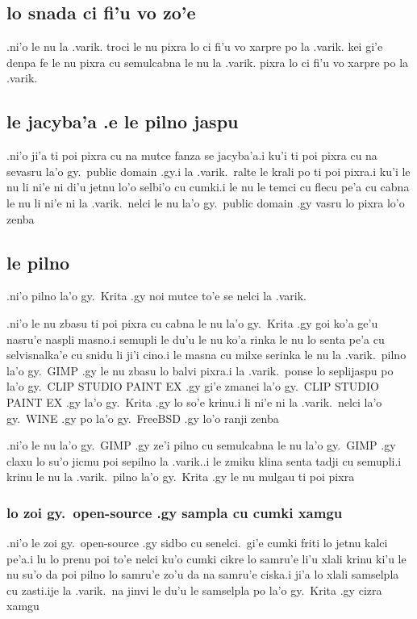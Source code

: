 \documentclass{report}
\begin{document}
\subsection{lo snada ci fi'u vo zo'e}
.ni'o le nu la .varik. troci le nu pixra lo ci fi'u vo xarpre po la .varik. kei gi'e denpa fe le nu pixra cu semulcabna le nu la .varik. pixra lo ci fi'u vo xarpre po la .varik.
\subsection{le jacyba'a .e le pilno jaspu}
.ni'o ji'a ti poi pixra cu na mutce fanza se jacyba'a\@  .i ku'i ti poi pixra cu na sevasru la'o gy.\ public domain .gy\@  .i la .varik.\ ralte le krali po ti poi pixra\@  .i ku'i le nu li ni'e ni di'u jetnu lo'o selbi'o cu cumki\@  .i le nu le temci cu flecu pe'a cu cabna le nu li ni'e ni la .varik.\ nelci le nu la'o gy.\ public domain .gy vasru lo pixra lo'o zenba
\subsection{le pilno}
.ni'o pilno la'o gy.\ Krita .gy noi mutce to'e se nelci la .varik.

.ni'o le nu zbasu ti poi pixra cu cabna le nu la'o gy.\ Krita .gy goi ko'a ge'u nasru'e naspli masno\@  .i semupli le du'u le nu ko'a rinka le nu lo senta pe'a cu selvisnalka'e cu snidu li ji'i cino\@  .i le masna cu milxe serinka le nu la .varik.\ pilno la'o gy.\ GIMP .gy le nu zbasu lo balvi pixra\@  .i la .varik.\ ponse lo seplijaspu po la'o gy.\ CLIP STUDIO PAINT EX .gy gi'e zmanei la'o gy.\ CLIP STUDIO PAINT EX .gy la'o gy.\ Krita .gy lo so'e krinu\@  .i li ni'e ni la .varik.\ nelci la'o gy.\ WINE .gy po la'o gy.\ FreeBSD .gy lo'o ranji zenba

.ni'o le nu la'o gy.\ GIMP .gy ze'i pilno cu semulcabna le nu la'o gy.\ GIMP .gy claxu lo su'o jicmu poi sepilno la .varik.\@  .i le zmiku klina senta tadji cu semupli\@  .i krinu le nu la .varik.\ pilno la'o gy.\ Krita .gy le nu mulgau ti poi pixra
\subsubsection{lo zoi gy.\ open-source .gy sampla cu cumki xamgu}
.ni'o le zoi gy.\ open-source .gy sidbo cu senelci.\ gi'e cumki friti lo jetnu kalci pe'a\@\@  .i lu lo prenu poi to'e nelci ku'o cumki cikre lo samru'e li'u xlali krinu ki'u le nu su'o da poi pilno lo samru'e zo'u da na samru'e ciska\@\@  .i ji'a lo xlali samselpla cu zasti\@  .ije la .varik.\ na jinvi le du'u le samselpla po la'o gy.\ Krita .gy cizra xamgu
\end{document}
